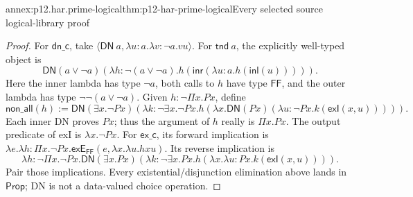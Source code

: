 \begin{annexitem}{annex:p12.har.prime-logical}{thm:p12-har-prime-logical}{Every selected source logical-library proof}
\begin{proof}
For \(\mathsf{dn\_c}\), take
\(\langle\mathsf{DN}\ a,\lambda u:a.\lambda v:\neg a.v u\rangle\).
For \(\mathsf{tnd}\ a\), the explicitly well-typed object is
\[
 \mathsf{DN}(a\vee\neg a)
  (\lambda h:\neg(a\vee\neg a).
      h(\mathsf{inr}(\lambda u:a.h(\mathsf{inl}(u))))).
\]
Here the inner lambda has type \(\neg a\), both calls to \(h\)
have type \(\mathsf{FF}\), and the outer lambda has type
\(\neg\neg(a\vee\neg a)\).
Given \(h:\neg\Pi x.P x\), define
\[
 \mathsf{non\_all}(h):=
 \mathsf{DN}(\exists x.\neg P x)
  (\lambda k:\neg\exists x.\neg P x.
     h(\lambda x.\mathsf{DN}(P x)
         (\lambda u:\neg P x.k(\mathsf{exI}(x,u))))).
\]
Each inner DN proves \(P x\); thus the argument of \(h\) really is
\(\Pi x.P x\). The output predicate of exI is \(\lambda x.\neg P x\).
For \(\mathsf{ex\_c}\), its forward implication is
\(\lambda e.\lambda h:\Pi x.\neg P x.
\mathsf{exE}_{\mathsf{FF}}(e,\lambda x.\lambda u.h x u)\).
Its reverse implication is
\[
 \lambda h:\neg\Pi x.\neg P x.
 \mathsf{DN}(\exists x.P x)
   (\lambda k:\neg\exists x.P x.
      h(\lambda x.\lambda u:P x.k(\mathsf{exI}(x,u)))).
\]
Pair those implications. Every existential/disjunction elimination above
lands in \(\mathsf{Prop}\); DN is not a data-valued choice operation.
\end{proof}
\end{annexitem}

